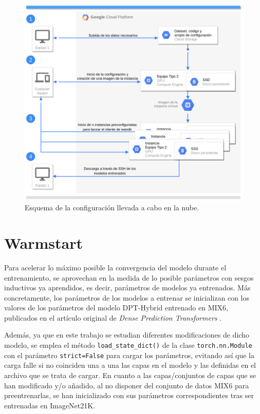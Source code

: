 \begin{figure}[H]
\centering
\includegraphics[width=\textwidth]{imagenes/cloud-diagram.png}
\caption{Esquema de la configuración llevada a cabo en la nube.}
\label{fig:cloud-diagram}
\end{figure}

\section{Warmstart}
Para acelerar lo máximo posible la convergencia del modelo durante el entrenamiento, se aprovechan en la medida de lo posible parámetros con sesgos inductivos ya aprendidos, es decir, parámetros de modelos ya entrenados. Más concretamente, los parámetros de los modelos a entrenar se inicializan con los valores de los parámetros del modelo DPT-Hybrid entrenado en MIX6, publicados en el artículo original de \textit{Dense Prediction Transformers} \cite{visiontransformersDPT}. 

Además, ya que en este trabajo se estudian diferentes modificaciones de dicho modelo, se emplea el método \texttt{load\_state\_dict()} de la clase \texttt{torch.nn.Module} con el parámetro \texttt{strict=False} para cargar los parámetros, evitando así que la carga falle si no coinciden una a una las capas en el modelo y las definidas en el archivo que se trata de cargar. En cuanto a las capas/conjuntos de capas que se han modificado y/o añadido, al no disponer del conjunto de datos MIX6 para preentrenarlas, se han inicializado con sus parámetros correspondientes tras ser entrenadas en ImageNet21K.

